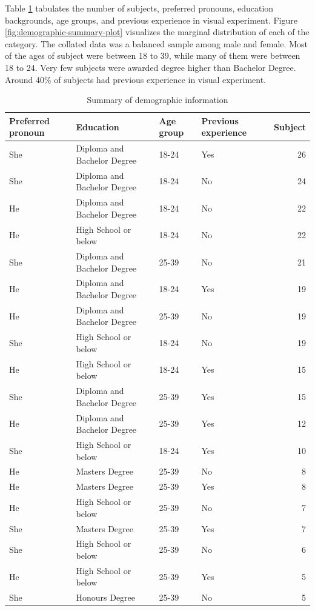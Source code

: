 \documentclass[]{interact}
\theoremstyle{plain}%
\theoremstyle{definition}
\theoremstyle{remark}
\begin{document}
Table \ref{tab:demographic-table} tabulates the number of subjects,
preferred pronouns, education backgrounds, age groups, and previous
experience in visual experiment. Figure
\ref{fig:demographic-summary-plot} visualizes the marginal distribution
of each of the category. The collated data was a balanced sample among
male and female. Most of the ages of subject were between 18 to 39,
while many of them were between 18 to 24. Very few subjects were awarded
degree higher than Bachelor Degree. Around 40\% of subjects had previous
experience in visual experiment.

\begin{table}

\caption{\label{tab:demographic-table}Summary of demographic information}
\centering
\begin{tabular}[t]{llllr}
\toprule
Preferred pronoun & Education & Age group & Previous experience & Subject\\
\midrule
She & Diploma and Bachelor Degree & 18-24 & Yes & 26\\
She & Diploma and Bachelor Degree & 18-24 & No & 24\\
He & Diploma and Bachelor Degree & 18-24 & No & 22\\
He & High School or below & 18-24 & No & 22\\
She & Diploma and Bachelor Degree & 25-39 & No & 21\\
He & Diploma and Bachelor Degree & 18-24 & Yes & 19\\
He & Diploma and Bachelor Degree & 25-39 & No & 19\\
She & High School or below & 18-24 & No & 19\\
He & High School or below & 18-24 & Yes & 15\\
She & Diploma and Bachelor Degree & 25-39 & Yes & 15\\
He & Diploma and Bachelor Degree & 25-39 & Yes & 12\\
She & High School or below & 18-24 & Yes & 10\\
He & Masters Degree & 25-39 & No & 8\\
He & Masters Degree & 25-39 & Yes & 8\\
He & High School or below & 25-39 & No & 7\\
She & Masters Degree & 25-39 & Yes & 7\\
She & High School or below & 25-39 & No & 6\\
He & High School or below & 25-39 & Yes & 5\\
She & Honours Degree & 25-39 & No & 5\\

\end{tabular}
\end{table}
\end{document}
